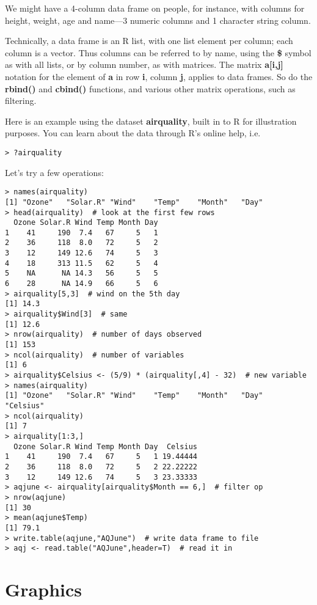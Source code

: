 We might have a 4-column data frame on people, for instance, with
columns for height, weight, age and name---3 numeric columns and 1
character string column.

Technically, a data frame is an R list, with one list element per
column; each column is a vector.  Thus columns can be referred to by
name, using the {\bf \$} symbol as with all lists, or by column number,
as with matrices.  The matrix {\bf a[i,j]} notation for the element of
{\bf a} in row {\bf i}, column {\bf j}, applies to data frames.  So do
the {\bf rbind()} and {\bf cbind()} functions, and various other matrix
operations, such as filtering.

Here is an example using the dataset {\bf airquality}, built in to R for
illustration purposes.  You can learn about the data through R's online
help, i.e. 

\begin{lstlisting}
> ?airquality
\end{lstlisting}

Let's try a few operations:

\begin{lstlisting}
> names(airquality)
[1] "Ozone"   "Solar.R" "Wind"    "Temp"    "Month"   "Day"    
> head(airquality)  # look at the first few rows
  Ozone Solar.R Wind Temp Month Day
1    41     190  7.4   67     5   1
2    36     118  8.0   72     5   2
3    12     149 12.6   74     5   3
4    18     313 11.5   62     5   4
5    NA      NA 14.3   56     5   5
6    28      NA 14.9   66     5   6
> airquality[5,3]  # wind on the 5th day
[1] 14.3
> airquality$Wind[3]  # same
[1] 12.6
> nrow(airquality)  # number of days observed
[1] 153
> ncol(airquality)  # number of variables
[1] 6
> airquality$Celsius <- (5/9) * (airquality[,4] - 32)  # new variable
> names(airquality)
[1] "Ozone"   "Solar.R" "Wind"    "Temp"    "Month"   "Day"     "Celsius"
> ncol(airquality)
[1] 7
> airquality[1:3,]
  Ozone Solar.R Wind Temp Month Day  Celsius
1    41     190  7.4   67     5   1 19.44444
2    36     118  8.0   72     5   2 22.22222
3    12     149 12.6   74     5   3 23.33333
> aqjune <- airquality[airquality$Month == 6,]  # filter op
> nrow(aqjune)
[1] 30
> mean(aqjune$Temp)
[1] 79.1
> write.table(aqjune,"AQJune")  # write data frame to file
> aqj <- read.table("AQJune",header=T)  # read it in
\end{lstlisting}

\section{Graphics}


